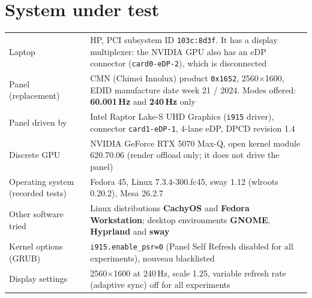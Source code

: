 \documentclass[11pt,a4paper]{article}
\newcommand{\reg}[1]{\texttt{#1}}
\begin{document}
\section{System under test}
\begin{table}[H]
\centering
\begin{tabularx}{\linewidth}{@{}l Y@{}}
\toprule
Laptop & HP, PCI subsystem ID \reg{103c:8d3f}. It has a display multiplexer: the NVIDIA GPU also has an eDP connector (\reg{card0-eDP-2}), which is disconnected\\
Panel (replacement) & CMN (Chimei Innolux) product \reg{0x1652}, 2560$\times$1600, EDID manufacture date week 21 / 2024. Modes offered: \textbf{60.001\,Hz} and \textbf{240\,Hz} only\\
Panel driven by & Intel Raptor Lake-S UHD Graphics (\reg{i915} driver), connector \reg{card1-eDP-1}, 4-lane eDP, DPCD revision 1.4\\
Discrete GPU & NVIDIA GeForce RTX 5070 Max-Q, open kernel module 620.70.06 (render offload only; it does not drive the panel)\\
Operating system (recorded tests) & Fedora 45, Linux 7.3.4-300.fc45, sway 1.12 (wlroots 0.20.2), Mesa 26.2.7\\
Other software tried & Linux distributions \textbf{CachyOS} and \textbf{Fedora Workstation}; desktop environments \textbf{GNOME}, \textbf{Hyprland} and \textbf{sway}\\
Kernel options (GRUB) & \reg{i915.enable\_psr=0} (Panel Self Refresh disabled for all experiments), nouveau blacklisted\\
Display settings & 2560$\times$1600 at 240\,Hz, scale 1.25, variable refresh rate (adaptive sync) off for all experiments\\
\bottomrule
\end{tabularx}
\end{table}

\end{document}
